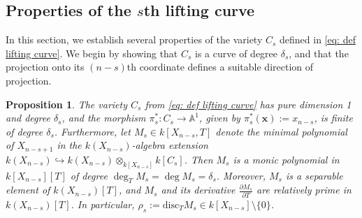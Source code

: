 \documentclass[pdflatex,sn-basic]{sn-jnl}%
\theoremstyle{thmstyleone}%
\newtheorem{proposition}[theorem]{Proposition}%
\theoremstyle{thmstyletwo}%
\theoremstyle{thmstylethree}%
\theoremstyle{definition}
\numberwithin{equation}{section}
\newcommand{\bfs}{\boldsymbol}
\newcommand{\A}{\mathbb A}
\begin{document}
\subsection{Properties of the $s$th lifting curve}\label{section: lifting curve properties}
%
In this section, we establish several properties of the variety
$C_s$ defined in \eqref{eq: def lifting curve}. We begin by showing
that $C_s$ is a curve of degree $\delta_s$, and that the projection
onto its $(n-s)$th coordinate defines a suitable direction of
projection. %
%
\begin{proposition}\label{prop: properties M_s}
The variety $C_s$ from \eqref{eq: def lifting curve} has pure
dimension 1 and degree $\delta_s$, and the morphism
$\pi_s^*:C_s\to\A^1$, given by $\pi_s^*(\bfs x):=x_{n-s}$, is finite
of degree $\delta_s$. Furthermore, let $M_s\in k[X_{n-s},T]$ denote
the minimal polynomial of $X_{n-s+1}$ in the $k(X_{n-s})$-algebra
extension $k(X_{n-s})\hookrightarrow
k(X_{n-s})\otimes_{k[X_{n-s}]}k[C_s]$. Then $M_s$ is a monic
polynomial in $k[X_{n-s}][T]$ of degree $\deg_TM_s=\deg
M_s=\delta_s$. Moreover, $M_s$ is a separable element of
$k(X_{n-s})[T]$, and $M_s$ and its derivative $\frac{\partial
M_s}{\partial T}$ are relatively prime in $k(X_{n-s})[T]$. In
particular, $\rho_s:=\mathrm{disc}_TM_s\in
k[X_{n-s}]\setminus\{0\}$.
\end{proposition}
%
\end{document}
